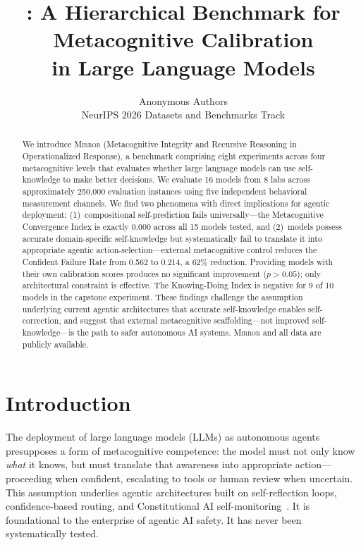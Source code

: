 \documentclass[10pt]{article}
\title{\mirror{}: A Hierarchical Benchmark for Metacognitive Calibration\\in Large Language Models}
\author{
  Anonymous Authors \\
  NeurIPS 2026 Datasets and Benchmarks Track
}
\newcommand{\mirror}{\textsc{Mirror}}
\begin{document}
\maketitle

\begin{abstract}
We introduce \mirror{} (Metacognitive Integrity and Recursive Reasoning in
Operationalized Response), a benchmark comprising eight experiments across four
metacognitive levels that evaluates whether large language models can use
self-knowledge to make better decisions. We evaluate 16 models from 8 labs across
approximately 250,000 evaluation instances using five independent behavioral
measurement channels. We find two phenomena with direct implications for agentic
deployment: (1)~compositional self-prediction fails universally---the Metacognitive
Convergence Index is exactly 0.000 across all 15 models tested, and (2)~models
possess accurate domain-specific self-knowledge but systematically fail to translate
it into appropriate agentic action-selection---external metacognitive control reduces
the Confident Failure Rate from 0.562 to 0.214, a 62\% reduction. Providing models
with their own calibration scores produces no significant improvement ($p > 0.05$);
only architectural constraint is effective. The Knowing-Doing Index is negative for
9 of 10 models in the capstone experiment. These findings challenge the assumption
underlying current agentic architectures that accurate self-knowledge enables
self-correction, and suggest that external metacognitive scaffolding---not improved
self-knowledge---is the path to safer autonomous AI systems. \mirror{} and all data
are publicly available.
\end{abstract}

\section{Introduction}
\label{sec:intro}

The deployment of large language models (LLMs) as autonomous agents presupposes a
form of metacognitive competence: the model must not only know \textit{what} it
knows, but must translate that awareness into appropriate action---proceeding when
confident, escalating to tools or human review when uncertain. This assumption
underlies agentic architectures built on self-reflection loops, confidence-based
routing, and Constitutional AI self-monitoring~\citep{perez2022sycophancy}. It is
foundational to the enterprise of agentic AI safety. It has never been
systematically tested.
\end{document}

